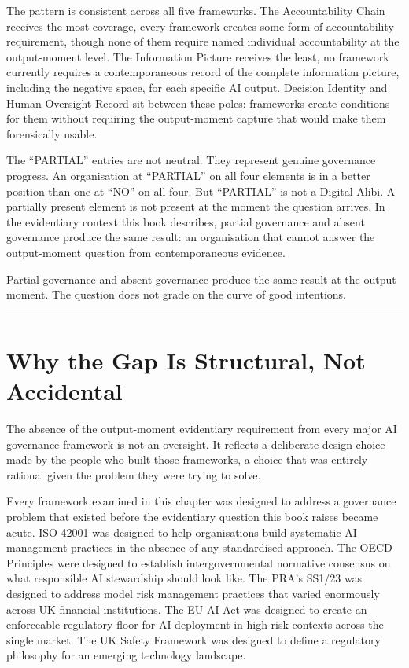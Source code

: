 The pattern is consistent across all five frameworks. The Accountability Chain receives the most coverage, every framework creates some form of accountability requirement, though none of them require named individual accountability at the output-moment level. The Information Picture receives the least, no framework currently requires a contemporaneous record of the complete information picture, including the negative space, for each specific AI output. Decision Identity and Human Oversight Record sit between these poles: frameworks create conditions for them without requiring the output-moment capture that would make them forensically usable.

The ``PARTIAL'' entries are not neutral. They represent genuine governance progress. An organisation at ``PARTIAL'' on all four elements is in a better position than one at ``NO'' on all four. But ``PARTIAL'' is not a Digital Alibi. A partially present element is not present at the moment the question arrives. In the evidentiary context this book describes, partial governance and absent governance produce the same result: an organisation that cannot answer the output-moment question from contemporaneous evidence.

Partial governance and absent governance produce the same result at the output moment. The question does not grade on the curve of good intentions.

\begin{center}\rule{0.5\linewidth}{0.5pt}\end{center}

\section{Why the Gap Is Structural, Not Accidental}

The absence of the output-moment evidentiary requirement from every major AI governance framework is not an oversight. It reflects a deliberate design choice made by the people who built those frameworks, a choice that was entirely rational given the problem they were trying to solve.

Every framework examined in this chapter was designed to address a governance problem that existed before the evidentiary question this book raises became acute. ISO 42001 was designed to help organisations build systematic AI management practices in the absence of any standardised approach. The OECD Principles were designed to establish intergovernmental normative consensus on what responsible AI stewardship should look like. The PRA's SS1/23 was designed to address model risk management practices that varied enormously across UK financial institutions. The EU AI Act was designed to create an enforceable regulatory floor for AI deployment in high-risk contexts across the single market. The UK Safety Framework was designed to define a regulatory philosophy for an emerging technology landscape.

